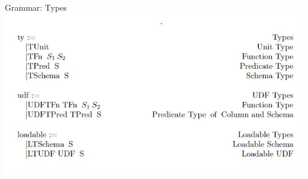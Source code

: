 \begin{frame}{Grammar: Types}
\centering
\includegraphics[scale=0.6]{Images/Grammar/Types.JPG} 
\end{frame}

